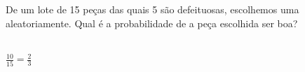 \begin{ex}
De um lote de 15 peças das quais 5 são defeituosas, escolhemos uma aleatoriamente. Qual é a probabilidade de a peça escolhida ser boa?
   \begin{sol}
   \phantom{A} \\
    $\frac{10}{15}=\frac{2}{3}$
  \end{sol}
 
\end{ex}